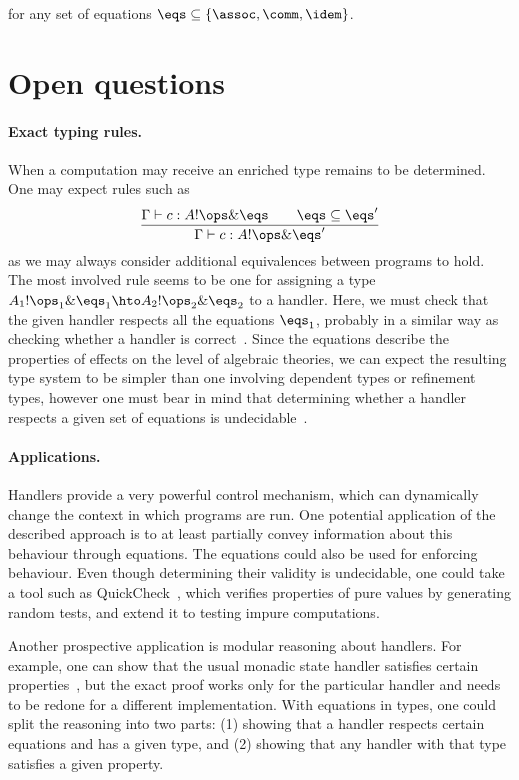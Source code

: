 \documentclass[a4paper,UKenglish]{dagrep}
\begin{document}
\noindent for any set of equations ${\eqs \subseteq \{ \assoc, \comm, \idem \}}$.

\section{Open questions}

\paragraph{Exact typing rules.}
When a computation may receive an enriched type remains to be determined. One may expect rules such as
\[
  \frac{\Gamma \vdash c : A ! \ops \& \eqs \qquad \eqs \subseteq \eqs'}{\Gamma \vdash c : A ! \ops \& \eqs'}
\]
as we may always consider additional equivalences between programs to hold. The most involved rule seems to be one for assigning a type $A_1 ! \ops_1 \& \eqs_1 \hto A_2 ! \ops_2 \& \eqs_2$ to a handler. Here, we must check that the given handler respects all the equations $\eqs_1$, probably in a similar way as checking whether a handler is correct~\cite{DBLP:journals/corr/PlotkinP13}. Since the equations describe the properties of effects on the level of algebraic theories, we can expect the resulting type system to be simpler than one involving dependent types or refinement types, however one must bear in mind that determining whether a handler respects a given set of equations is undecidable~\cite{DBLP:journals/corr/PlotkinP13}.

\paragraph{Applications.}
Handlers provide a very powerful control mechanism, which can dynamically change the context in which programs are run. One potential application of the described approach is to at least partially convey information about this behaviour through equations. The equations could also be used for enforcing behaviour. Even though determining their validity is undecidable, one could take a tool such as QuickCheck~\cite{DBLP:conf/icfp/ClaessenH00}, which verifies properties of pure values by generating random tests, and extend it to testing impure computations.

Another prospective application is modular reasoning about handlers. For example, one can show that the usual monadic state handler satisfies certain properties~\cite{DBLP:journals/corr/BauerP13}, but the exact proof works only for the particular handler and needs to be redone for a different implementation. With equations in types, one could split the reasoning into two parts: (1) showing that a handler respects certain equations and has a given type, and (2) showing that any handler with that type satisfies a given property.
\end{document}
